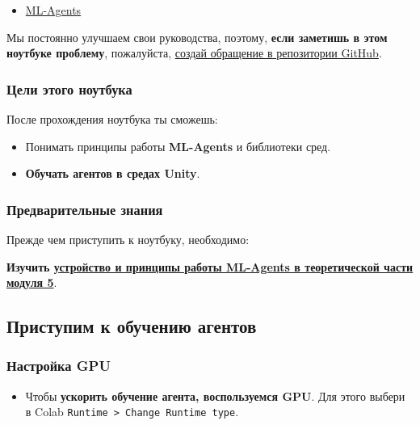 \documentclass[11pt,a4paper]{article}
\begin{document}
\begin{itemize}
\tightlist
\item
  \href{https://github.com/Unity-Technologies/ml-agents}{ML-Agents}
\end{itemize}

Мы постоянно улучшаем свои руководства, поэтому, \textbf{если заметишь в этом ноутбуке проблему}, пожалуйста, \href{https://github.com/huggingface/deep-rl-class/issues}{создай обращение в репозитории GitHub}.

\subsubsection{Цели этого ноутбука}\label{objectives-of-this-notebook}

После прохождения ноутбука ты сможешь:

\begin{itemize}
\tightlist
\item
  Понимать принципы работы \textbf{ML-Agents} и библиотеки сред.
\item
  \textbf{Обучать агентов в средах Unity}.
\end{itemize}

\subsubsection{Предварительные знания}\label{prerequisites}

Прежде чем приступить к ноутбуку, необходимо:

\textbf{Изучить \href{https://huggingface.co/deep-rl-course/unit5/introduction}{устройство и принципы работы ML-Agents в теоретической части модуля 5}}.

\subsection{Приступим к обучению агентов}\label{lets-train-our-agents}

\subsubsection{Настройка GPU}\label{set-the-gpu}

\begin{itemize}
\tightlist
\item
  Чтобы \textbf{ускорить обучение агента, воспользуемся GPU}. Для этого выбери в Colab \texttt{Runtime\ \textgreater{}\ Change\ Runtime\ type}.
\end{itemize}
\end{document}
